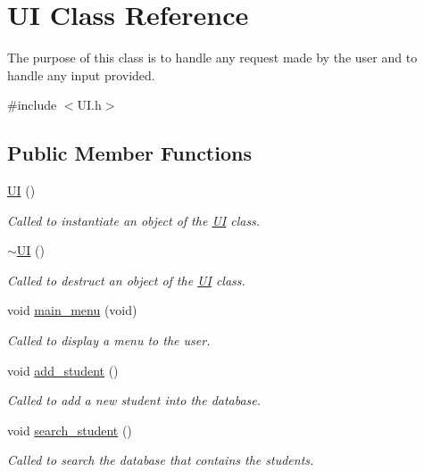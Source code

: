 \hypertarget{class_u_i}{\section{U\-I Class Reference}
\label{class_u_i}
}


The purpose of this class is to handle any request made by the user and to handle any input provided.  




{\ttfamily \#include $<$U\-I.\-h$>$}

\subsection*{Public Member Functions}
\begin{DoxyCompactItemize}
\item 
\hyperlink{class_u_i_a675985a56b5e87ebdc8e5884b9f2ee09}{U\-I} ()
\begin{DoxyCompactList}\small\item\em Called to instantiate an object of the \hyperlink{class_u_i}{U\-I} class. \end{DoxyCompactList}\item 
\hyperlink{class_u_i_a1b23d0c64c7cbb3d143d90ec532a7ccd}{$\sim$\-U\-I} ()
\begin{DoxyCompactList}\small\item\em Called to destruct an object of the \hyperlink{class_u_i}{U\-I} class. \end{DoxyCompactList}\item 
void \hyperlink{class_u_i_a98dd3c26da7c3b17ee4357d844381846}{main\-\_\-menu} (void)
\begin{DoxyCompactList}\small\item\em Called to display a menu to the user. \end{DoxyCompactList}\item 
void \hyperlink{class_u_i_aebf168eede13c3866a4954676894611e}{add\-\_\-student} ()
\begin{DoxyCompactList}\small\item\em Called to add a new student into the database. \end{DoxyCompactList}\item 
void \hyperlink{class_u_i_a0e31d80ea80cdf9b1a1284ff2e2a53dd}{search\-\_\-student} ()
\begin{DoxyCompactList}\small\item\em Called to search the database that contains the students. \end{DoxyCompactList}\item 

\end{DoxyCompactItemize}
